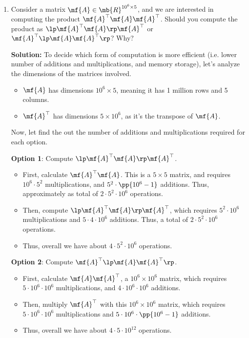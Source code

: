 \begin{enumerate}
    \item Consider a matrix $\mf{A} \in \mb{R}^{10^6 \times 5}$, and we are interested in computing the product $\mf{A}^\top\mf{A}\mf{A}^\top$. Should you compute the product as $\lp \mf{A}^\top\mf{A} \rp\mf{A}^\top$ or $\mf{A}^\top\lp \mf{A}\mf{A}^\top \rp$? Why?

    \begin{boxedstuff}
        \vspace{4mm}
        \textbf{Solution:} To decide which form of computation is more efficient (i.e. lower number of additions and multiplications, and memory storage), let's analyze the dimensions of the matrices involved.
        \begin{itemize}
            \item $\mf{A}$ has dimensions $10^6 \times 5$, meaning it has 1 million rows and 5 columns.
            \item $\mf{A}^\top$ has dimensions $5 \times 10^6$, as it's the transpose of $\mf{A}$.
        \end{itemize}

        Now, let find the out the number of additions and multiplications required for each option.

        \textbf{Option 1}: Compute $\lp \mf{A}^\top \mf{A} \rp \mf{A}^\top$.
        \begin{itemize}
            \item First, calculate $\mf{A}^\top \mf{A}$. This is a $5 \times 5$ matrix, and requires $10^6 \cdot 5^2$ multiplications, and $5^2 \cdot \pp{10^6 - 1}$ additions. Thus, approximately as total of $2 \cdot 5^2 \cdot 10^6$ operations.
            \item Then, compute $\lp \mf{A}^\top \mf{A} \rp \mf{A}^\top$, which requires $5^2 \cdot 10^6$ multiplications and $5 \cdot 4 \cdot 10^6$ additions. Thus, a total of $2 \cdot 5^2 \cdot 10^6$ operations.
            \item Thus, overall we have about $4 \cdot 5^2 \cdot 10^6$ operations.
        \end{itemize}

        \textbf{Option 2}: Compute $\mf{A}^\top \lp \mf{A}\mf{A}^\top \rp$.
        \begin{itemize}
            \item First, calculate $\mf{A} \mf{A}^\top$, a $10^6 \times 10^6$ matrix, which requires $5 \cdot 10^6 \cdot 10^6$ multiplications, and $4 \cdot 10^6  \cdot 10^6$ additions.
            \item Then, multiply $\mf{A}^\top$ with this $10^6 \times 10^6$ matrix, which requires $5 \cdot 10^6 \cdot 10^{6}$ multiplications and $5 \cdot 10^6 \cdot \pp{10^6 -1}$ additions.
            \item Thus, overall we have about $4 \cdot 5 \cdot 10^{12}$ operations.
        \end{itemize}


\end{boxedstuff}
\end{enumerate}
